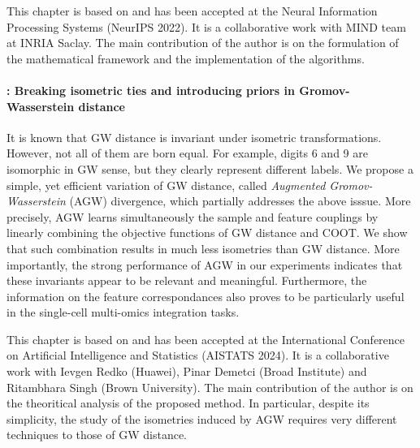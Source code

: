 This chapter is based on \citep{Thual22} and has been accepted at the
Neural Information Processing Systems (NeurIPS 2022).
It is a collaborative work with MIND team at INRIA Saclay.
The main contribution of the author is on the formulation of the mathematical framework
and the implementation of the algorithms.

\paragraph{: Breaking isometric ties and introducing priors in
Gromov-Wasserstein distance}

It is known that GW distance is invariant under isometric transformations. However,
not all of them are born equal. For example, digits 6 and 9 are isomorphic in GW sense,
but they clearly represent different labels. We propose a simple,
yet efficient variation of GW distance, called \textit{Augmented Gromov-Wasserstein} (AGW) divergence,
which partially addresses the above isssue.
More precisely, AGW learns simultaneously the sample and feature couplings by
linearly combining the objective functions of GW distance and COOT.
We show that such combination results in much less isometries than GW distance.
More importantly, the strong performance of AGW in our experiments indicates
that these invariants appear to be relevant and meaningful.
Furthermore, the information on the feature correspondances also proves to be particularly useful
in the single-cell multi-omics integration tasks.

This chapter is based on \citep{Demetci23} and has been accepted at the
International Conference on Artificial Intelligence and Statistics (AISTATS 2024).
It is a collaborative work with Ievgen Redko (Huawei), Pinar Demetci (Broad Institute)
and Ritambhara Singh (Brown University). The main contribution of the author is on the
theoritical analysis of the proposed method. In particular, despite its simplicity,
the study of the isometries induced by AGW requires very different techniques
to those of GW distance.